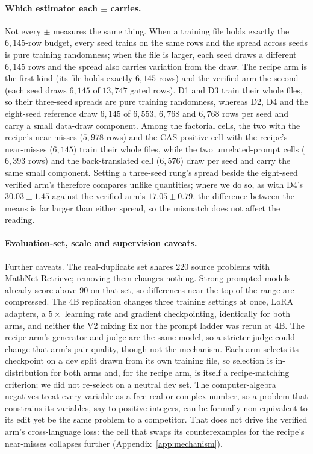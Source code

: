 \paragraph{Which estimator each $\pm$ carries.}
Not every $\pm$ measures the same thing. When a training file holds exactly the $6{,}145$-row budget, every seed trains on the same rows and the spread across seeds is pure training randomness; when the file is larger, each seed draws a different $6{,}145$ rows and the spread also carries variation from the draw. The recipe arm is the first kind (its file holds exactly $6{,}145$ rows) and the verified arm the second (each seed draws $6{,}145$ of $13{,}747$ gated rows). D1 and D3 train their whole files, so their three-seed spreads are pure training randomness, whereas D2, D4 and the eight-seed reference draw $6{,}145$ of $6{,}553$, $6{,}768$ and $6{,}768$ rows per seed and carry a small data-draw component. Among the factorial cells, the two with the recipe's near-misses ($5{,}978$ rows) and the CAS-positive cell with the recipe's near-misses ($6{,}145$) train their whole files, while the two unrelated-prompt cells ($6{,}393$ rows) and the back-translated cell ($6{,}576$) draw per seed and carry the same small component. Setting a three-seed rung's spread beside the eight-seed verified arm's therefore compares unlike quantities; where we do so, as with D4's $30.03 \pm 1.45$ against the verified arm's $17.05 \pm 0.79$, the difference between the means is far larger than either spread, so the mismatch does not affect the reading.

\paragraph{Evaluation-set, scale and supervision caveats.}
Further caveats. The real-duplicate set shares $220$ source problems with MathNet-Retrieve; removing them changes nothing. Strong prompted models already score above $90$ on that set, so differences near the top of the range are compressed. The $4$B replication changes three training settings at once, LoRA adapters, a $5\times$ learning rate and gradient checkpointing, identically for both arms, and neither the V2 mixing fix nor the prompt ladder was rerun at $4$B. The recipe arm's generator and judge are the same model, so a stricter judge could change that arm's pair quality, though not the mechanism. Each arm selects its checkpoint on a dev split drawn from its own training file, so selection is in-distribution for both arms and, for the recipe arm, is itself a recipe-matching criterion; we did not re-select on a neutral dev set. The computer-algebra negatives treat every variable as a free real or complex number, so a problem that constrains its variables, say to positive integers, can be formally non-equivalent to its edit yet be the same problem to a competitor. That does not drive the verified arm's cross-language loss: the cell that swaps its counterexamples for the recipe's near-misses collapses further (Appendix~\ref{app:mechanism}).

